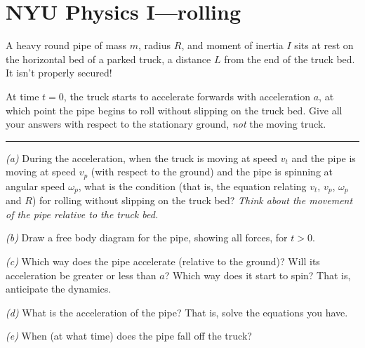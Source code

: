 \documentclass[12pt]{article}
\begin{document}
\section*{NYU Physics I---rolling}

A heavy round pipe of mass $m$, radius $R$, and moment of inertia $I$
sits at rest on the horizontal bed of a parked truck, a distance $L$
from the end of the truck bed.  It isn't properly secured!

At time $t=0$, the truck starts to
accelerate forwards with acceleration $a$, at which point the pipe
begins to roll without slipping on the truck bed.  Give all your
answers with respect to the stationary ground, {\em not} the moving
truck. \\ \rule{0.3\textwidth}{0pt}

\textsl{(a)} During the acceleration, when the truck is moving at
speed $v_t$ and the pipe is moving at speed $v_p$ (with respect to the
ground) and the pipe is spinning at angular speed $\omega_p$, what is
the condition (that is, the equation relating $v_t$, $v_p$, $\omega_p$
and $R$) for rolling without slipping on the truck bed?  \emph{Think
about the movement of the pipe relative to the truck bed.}

\textsl{(b)} Draw a free body diagram for the pipe, showing all
forces, for $t>0$.

\textsl{(c)} Which way does the pipe accelerate (relative to the
ground)?  Will its acceleration be greater or less than $a$?  Which
way does it start to spin?  That is, anticipate the dynamics.

\textsl{(d)} What is the acceleration of the pipe?  That is, solve the
equations you have.

\textsl{(e)} When (at what time) does the pipe fall off the truck?
\end{document}
